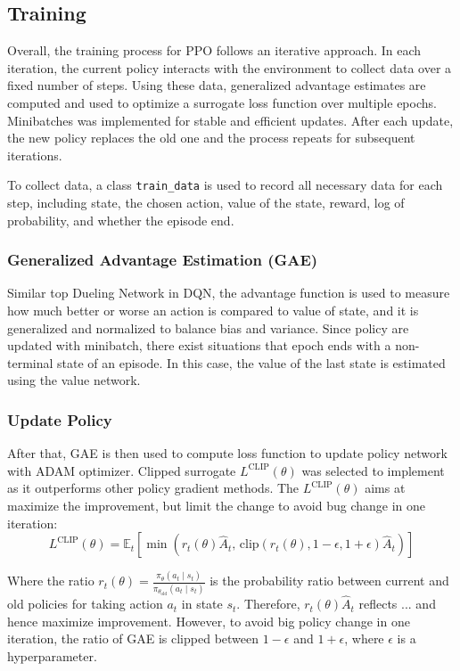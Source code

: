 \documentclass{article}
\begin{document}
\subsection{Training}
Overall, the training process for PPO follows an iterative approach\cite{schulman_proximal_2017}. In each iteration, the current policy interacts with the environment to collect data over a fixed number of steps. Using these data, generalized advantage estimates are computed and used to optimize a surrogate loss function over multiple epochs. Minibatches was implemented for stable and efficient updates. After each update, the new policy replaces the old one and the process repeats for subsequent iterations. 

To collect data, a class \texttt{train\_data} is used to record all necessary data for each step, including state, the chosen action, value of the state, reward, log of probability, and whether the episode end.

\subsubsection{Generalized Advantage Estimation (GAE)}
Similar top Dueling Network in DQN, the advantage function is used to measure how much better or worse an action is compared to value of state, and it is generalized and normalized to balance bias and variance. Since policy are updated with minibatch, there exist situations that epoch ends with a non-terminal state of an episode. In this case, the value of the last state is estimated using the value network.

\subsubsection{Update Policy}
After that, GAE is then used to compute loss function to update policy network with ADAM optimizer. Clipped surrogate $L^{\text{CLIP}}(\theta)$ was selected to implement as it outperforms other policy gradient methods\cite{schulman_proximal_2017}. The $L^{\text{CLIP}}(\theta)$ aims at maximize the improvement, but limit the change to avoid bug change in one iteration:
\begin{equation}
    L^{\text{CLIP}}(\theta) = \mathbb{E}_t \left[ \min \left( r_t(\theta) \hat{A}_t, \, \text{clip} \left( r_t(\theta), 1 - \epsilon, 1 + \epsilon \right) \hat{A}_t \right) \right]
\end{equation}

Where the ratio $r_t(\theta) = \frac{\pi_\theta(a_t \mid s_t)}{\pi_{\theta_\text{old}}(a_t \mid s_t)}$ is the probability ratio between current and old policies for taking action $a_t$ in state $s_t$. Therefore, $r_t(\theta) \hat{A}_t$ reflects ... and hence maximize improvement. However, to avoid big policy change in one iteration, the ratio of GAE is clipped between $1 - \epsilon$ and $1 + \epsilon$, where $\epsilon$ is a hyperparameter.
\end{document}
